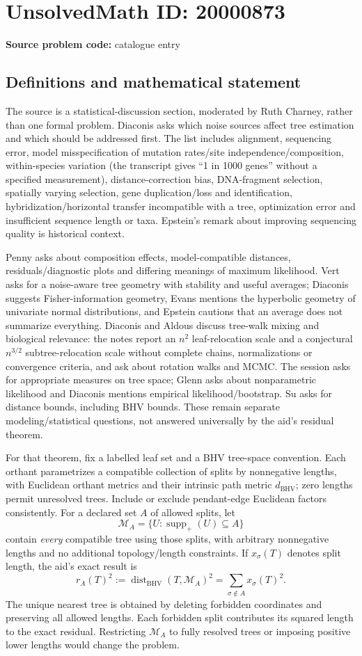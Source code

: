 \documentclass[11pt]{article}
\begin{document}
\section*{UnsolvedMath ID: 20000873}
\textbf{Source problem code:} catalogue entry
\subsection{Definitions and mathematical statement}
The source is a statistical-discussion section, moderated by Ruth Charney, rather than one formal problem. Diaconis asks which noise sources affect tree estimation and which should be addressed first. The list includes alignment, sequencing error, model misspecification of mutation rates/site independence/composition, within-species variation (the transcript gives ``1 in 1000 genes'' without a specified measurement), distance-correction bias, DNA-fragment selection, spatially varying selection, gene duplication/loss and identification, hybridization/horizontal transfer incompatible with a tree, optimization error and insufficient sequence length or taxa. Epstein's remark about improving sequencing quality is historical context.

Penny asks about composition effects, model-compatible distances, residuals/diagnostic plots and differing meanings of maximum likelihood. Vert asks for a noise-aware tree geometry with stability and useful averages; Diaconis suggests Fisher-information geometry, Evans mentions the hyperbolic geometry of univariate normal distributions, and Epstein cautions that an average does not summarize everything. Diaconis and Aldous discuss tree-walk mixing and biological relevance: the notes report an $n^2$ leaf-relocation scale and a conjectural $n^{3/2}$ subtree-relocation scale without complete chains, normalizations or convergence criteria, and ask about rotation walks and MCMC. The session asks for appropriate measures on tree space; Glenn asks about nonparametric likelihood and Diaconis mentions empirical likelihood/bootstrap. Su asks for distance bounds, including BHV bounds. These remain separate modeling/statistical questions, not answered universally by the aid's residual theorem.

For that theorem, fix a labelled leaf set and a BHV tree-space convention. Each orthant parametrizes a compatible collection of splits by nonnegative lengths, with Euclidean orthant metrics and their intrinsic path metric $d_{\mathrm{BHV}}$; zero lengths permit unresolved trees. Include or exclude pendant-edge Euclidean factors consistently. For a declared set $A$ of allowed splits, let
\[
 \mathcal M_A=\{U:\operatorname{supp}_+(U)\subseteq A\}
\]
contain \emph{every} compatible tree using those splits, with arbitrary nonnegative lengths and no additional topology/length constraints. If $x_\sigma(T)$ denotes split length, the aid's exact result is
\[
 r_A(T)^2:=\operatorname{dist}_{\mathrm{BHV}}(T,\mathcal M_A)^2
 =\sum_{\sigma\notin A}x_\sigma(T)^2.
\]
The unique nearest tree is obtained by deleting forbidden coordinates and preserving all allowed lengths. Each forbidden split contributes its squared length to the exact residual. Restricting $\mathcal M_A$ to fully resolved trees or imposing positive lower lengths would change the problem.
\end{document}
